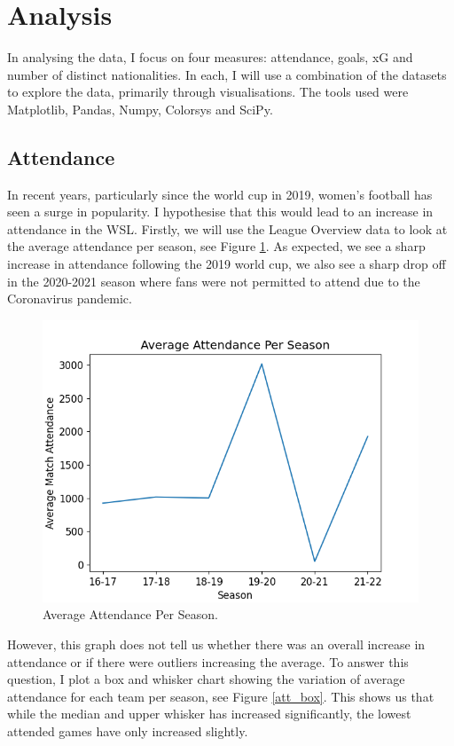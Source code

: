 \documentclass[12pt, a4paper, twocolumn]{article}
\begin{document}
\section{Analysis}

In analysing the data, I focus on four measures: attendance, goals, xG and number of distinct nationalities. In each, I will use a combination of the datasets to explore the data, primarily through visualisations. The tools used were Matplotlib, Pandas, Numpy, Colorsys and SciPy.

\subsection{Attendance}

In recent years, particularly since the world cup in 2019, women's football has seen a surge in popularity. I hypothesise that this would lead to an increase in attendance in the WSL. Firstly, we will use the League Overview data to look at the average attendance per season, see Figure \ref{avg_att}. As expected, we see a sharp increase in attendance following the 2019 world cup, we also see a sharp drop off in the 2020-2021 season where fans were not permitted to attend due to the Coronavirus pandemic. 

\begin{figure}
  \includegraphics[width=\linewidth]{../vis/tables/average_attendance.png}
  \caption{Average Attendance Per Season.}
  \label{avg_att}
 \end{figure}

However, this graph does not tell us whether there was an overall increase in attendance or if there were outliers increasing the average. To answer this question, I plot a box and whisker chart showing the variation of average attendance for each team per season, see Figure \ref{att_box}. This shows us that while the median and upper whisker has increased significantly, the lowest attended games have only increased slightly.
\end{document}
